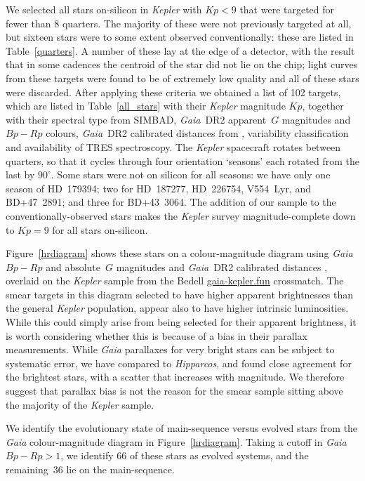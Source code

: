 \documentclass[a4paper,fleqn,usenatbib]{mnras}
\newcommand{\kepler}{\textit{Kepler}\xspace}
\newcommand{\hipparcos}{\textit{Hipparcos}\xspace}
\newcommand{\gaia}{\textit{Gaia}\xspace}
\begin{document}
We selected all stars on-silicon in \kepler with $Kp<9$ that were targeted for fewer than $8$ quarters. The majority of these were not previously targeted at all, but sixteen stars were to some extent observed conventionally: these are listed in Table~\ref{quarters}. A number of these lay at the edge of a detector, with the result that in some cadences the centroid of the star did not lie on the chip; light curves from these targets were found to be of extremely low quality and all of these stars were discarded. After applying these criteria we obtained a list of 102 targets, which are listed in Table~\ref{all_stars} with their \kepler magnitude $Kp$, together with their spectral type from SIMBAD, \gaia~DR2 apparent~$G$ magnitudes and $Bp-Rp$ colours, \gaia~DR2 calibrated distances from \citet{gaiadists}, variability classification and availability of TRES spectroscopy. The \kepler spacecraft rotates between quarters, so that it cycles through four orientation `seasons' each rotated from the last by $90^{\circ}$. Some stars were not on silicon for all seasons: we have only one season of HD~179394; two for HD~187277, HD~226754, V554~Lyr, and BD+47~2891; and three for BD+43~3064. The addition of our sample to the conventionally-observed stars makes the \kepler survey magnitude-complete down to $Kp=9$ for all stars on-silicon.



Figure~\ref{hrdiagram} shows these stars on a colour-magnitude diagram using \gaia $Bp-Rp$ and absolute~$G$ magnitudes and \gaia~DR2 calibrated distances \citep{gaiadists}, overlaid on the \kepler sample from the Bedell \url{gaia-kepler.fun} crossmatch. The smear targets in this diagram selected to have higher apparent brightnesses than the general \kepler population, appear also to have higher intrinsic luminosities. While this could simply arise from being selected for their apparent brightness, it is {}worth considering whether this is because of a bias in their parallax measurements. While \gaia parallaxes for very bright stars can be subject to systematic error, we have compared to \hipparcos \citep{vanleeuwen07b}, and found close agreement for the brightest stars, with a scatter that increases with magnitude. We therefore suggest that parallax bias is not the reason for the smear sample sitting above the majority of the \kepler sample.

We identify the evolutionary state of main-sequence versus evolved stars from the \gaia colour-magnitude diagram in Figure~\ref{hrdiagram}. Taking a cutoff in \gaia $Bp-Rp > 1$, we identify 66 of these stars as evolved systems, and the remaining~36 lie on the main-sequence. 
\end{document}

